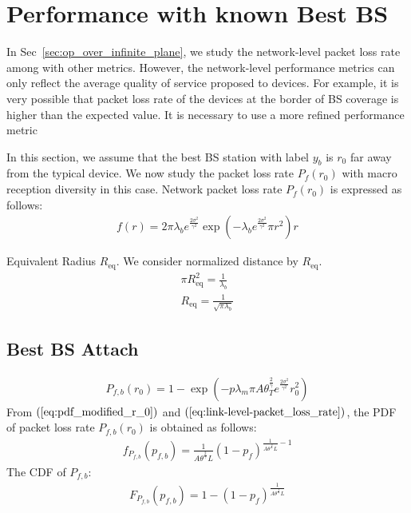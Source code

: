 \section{Performance with known Best BS}
 In Sec~\ref{sec:op_over_infinite_plane}, we study the network-level packet loss rate among with other metrics. However, the network-level performance metrics can only reflect the average quality of service proposed to devices. For example, it is very possible that packet loss rate of the devices at the border of BS coverage is higher than the expected value. It is necessary to use a more refined performance metric

In this section, we assume that the best BS station with label $y_b$ is $r_{0}$ far away from the typical device. We now study the packet loss rate $P_{f}(r_{0})$ with macro reception diversity in this case. Network packet loss rate $P_{f}(r_{0})$ is expressed as follows:
\begin{align}
\label{eq:pdf_modified_r_0}
	f(r) = 2 \pi \lambda_b e^{\frac{2\sigma^2}{\gamma^2}}  \exp( -\lambda_b  e^{\frac{2\sigma^2}{\gamma^2}} \pi r^2 ) r 
\end{align}




Equivalent Radius $R_{\text{eq}}$. We consider normalized distance by $R_{\text{eq}}$.
\begin{align}
	\pi R_{\text{eq}} ^ 2 = \frac{1}{\lambda_{b}} \\
	 R_{\text{eq}}  = \frac{1}{\sqrt{\pi \lambda_{b}}}
\end{align}
\subsection{Best BS Attach}
\begin{align}
	\label{eq:link-level-packet_loss_rate}
	P_{f, b}(r_{0}) = 1- \exp(-p \lambda_{m} \pi A \theta_{T}^{\frac{2}{\gamma}} e^{\frac{2\sigma^2}{\gamma^2}}  r_{0}^2 )
\end{align}
From $(\ref{eq:pdf_modified_r_0})$ and $(\ref{eq:link-level-packet_loss_rate})$, the PDF of packet loss rate $P_{f, b}(r_{0})$ is obtained as follows:
\begin{align}
	f_{P_{f,b}}(p_{f,b}) =\frac{1}{ A \theta^{\frac{2}{\gamma}} L } (1-p_f)^{ \frac{1}{  A \theta^{\frac{2}{\gamma}} L } - 1} 
\end{align}
The CDF of $P_{f,b}$:
\begin{align}
F_{P_{f,b}}(p_{f,b}) =1 - (1-p_f)^{ \frac{1}{  A \theta^{\frac{2}{\gamma}} L } } 
\end{align}

